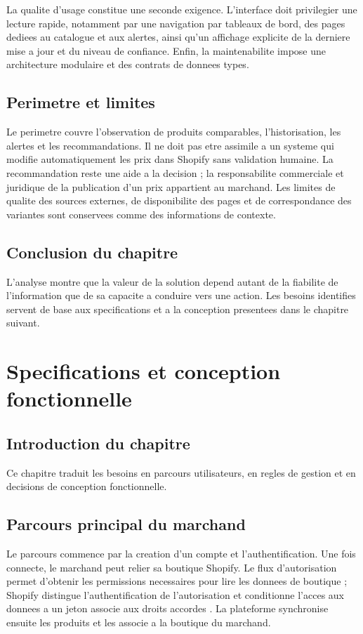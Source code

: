 \documentclass[12pt,a4paper,oneside]{report}
\begin{document}
La qualite d'usage constitue une seconde exigence. L'interface doit privilegier une lecture rapide, notamment par une navigation par tableaux de bord, des pages dediees au catalogue et aux alertes, ainsi qu'un affichage explicite de la derniere mise a jour et du niveau de confiance. Enfin, la maintenabilite impose une architecture modulaire et des contrats de donnees types.

\section{Perimetre et limites}
Le perimetre couvre l'observation de produits comparables, l'historisation, les alertes et les recommandations. Il ne doit pas etre assimile a un systeme qui modifie automatiquement les prix dans Shopify sans validation humaine. La recommandation reste une aide a la decision ; la responsabilite commerciale et juridique de la publication d'un prix appartient au marchand. Les limites de qualite des sources externes, de disponibilite des pages et de correspondance des variantes sont conservees comme des informations de contexte.

\section*{Conclusion du chapitre}
L'analyse montre que la valeur de la solution depend autant de la fiabilite de l'information que de sa capacite a conduire vers une action. Les besoins identifies servent de base aux specifications et a la conception presentees dans le chapitre suivant.
\clearpage

\chapter{Specifications et conception fonctionnelle}
\section*{Introduction du chapitre}
Ce chapitre traduit les besoins en parcours utilisateurs, en regles de gestion et en decisions de conception fonctionnelle.

\section{Parcours principal du marchand}
Le parcours commence par la creation d'un compte et l'authentification. Une fois connecte, le marchand peut relier sa boutique Shopify. Le flux d'autorisation permet d'obtenir les permissions necessaires pour lire les donnees de boutique ; Shopify distingue l'authentification de l'autorisation et conditionne l'acces aux donnees a un jeton associe aux droits accordes \cite{shopifyauth}. La plateforme synchronise ensuite les produits et les associe a la boutique du marchand.
\end{document}
